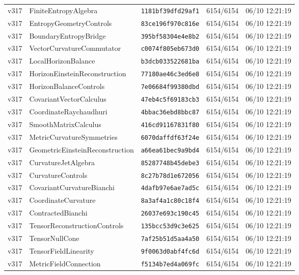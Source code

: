 \documentclass[11pt]{article}
\theoremstyle{definition}\newtheorem{deriv}{Derivation}
\begin{document}
{\begin{longtable}{@{}lllll@{}}
v317 & FiniteEntropyAlgebra & \texttt{1181bf39dfd29af1} & 6154/6154 & 06/10 12:21:19 \\
v317 & EntropyGeometryControls & \texttt{83ce196f970c816e} & 6154/6154 & 06/10 12:21:19 \\
v317 & BoundaryEntropyBridge & \texttt{395bf58304e4e8b2} & 6154/6154 & 06/10 12:21:19 \\
v317 & VectorCurvatureCommutator & \texttt{c0074f805eb673d0} & 6154/6154 & 06/10 12:21:19 \\
v317 & LocalHorizonBalance & \texttt{b3dcb033522681ba} & 6154/6154 & 06/10 12:21:19 \\
v317 & HorizonEinsteinReconstruction & \texttt{77180ae46c3ed6e8} & 6154/6154 & 06/10 12:21:19 \\
v317 & HorizonBalanceControls & \texttt{7e06684f99380dbd} & 6154/6154 & 06/10 12:21:19 \\
v317 & CovariantVectorCalculus & \texttt{47eb4c5f69183cb3} & 6154/6154 & 06/10 12:21:19 \\
v317 & CoordinateRaychaudhuri & \texttt{4bbac36ebd8bbc87} & 6154/6154 & 06/10 12:21:19 \\
v317 & SmoothMatrixCalculus & \texttt{416cd91167831f80} & 6154/6154 & 06/10 12:21:19 \\
v317 & MetricCurvatureSymmetries & \texttt{6070daffdf63f24e} & 6154/6154 & 06/10 12:21:19 \\
v317 & GeometricEinsteinReconstruction & \texttt{a66ea61bec9a9bd4} & 6154/6154 & 06/10 12:21:19 \\
v317 & CurvatureJetAlgebra & \texttt{85287748b45debe3} & 6154/6154 & 06/10 12:21:19 \\
v317 & CurvatureControls & \texttt{8c27b78d1e672056} & 6154/6154 & 06/10 12:21:19 \\
v317 & CovariantCurvatureBianchi & \texttt{4dafb97e6ae7ad5c} & 6154/6154 & 06/10 12:21:19 \\
v317 & CoordinateCurvature & \texttt{8a3af4a1c80c18f4} & 6154/6154 & 06/10 12:21:19 \\
v317 & ContractedBianchi & \texttt{26037e693c190c45} & 6154/6154 & 06/10 12:21:19 \\
v317 & TensorReconstructionControls & \texttt{135bcc53d9c3e625} & 6154/6154 & 06/10 12:21:19 \\
v317 & TensorNullCone & \texttt{7af25b51d5aa4a50} & 6154/6154 & 06/10 12:21:19 \\
v317 & TensorFieldLinearity & \texttt{9f0063d0abf4fc6d} & 6154/6154 & 06/10 12:21:19 \\
v317 & MetricFieldConnection & \texttt{f5134b7ed4a069fc} & 6154/6154 & 06/10 12:21:19 \\

\end{longtable}}
\end{document}
